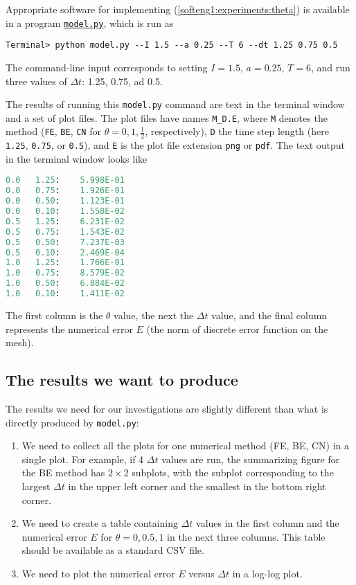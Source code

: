 \documentclass[graybox,sectrefs,envcountresetchap,open=right,final]{svmonodo}
\begin{document}
Appropriate software for implementing (\ref{softeng1:experiments:theta})
is available in a program \href{{http://tinyurl.com/nc4upel/doconce_src/model.py}}{\nolinkurl{model.py}}, which is run as

\begin{Verbatim}[frame=lines,label=\fbox{{\tiny Terminal}},framesep=2.5mm,framerule=0.7pt,fontsize=\fontsize{9pt}{9pt}]
Terminal> python model.py --I 1.5 --a 0.25 --T 6 --dt 1.25 0.75 0.5
\end{Verbatim}
The command-line input corresponds to setting $I=1.5$, $a=0.25$, $T=6$,
and run three values of $\Delta t$: 1.25, 0.75, ad 0.5.

The results of running this \texttt{model.py} command are text in the
terminal window and a set of plot files.
The plot files have names \Verb!M_D.E!, where \texttt{M} denotes the method
(\texttt{FE}, \texttt{BE}, \texttt{CN} for $\theta=0,1,\frac{1}{2}$, respectively), \texttt{D}
the time step length (here \texttt{1.25}, \texttt{0.75}, or \texttt{0.5}), and \texttt{E}
is the plot file extension \texttt{png} or \texttt{pdf}.
The text output in the terminal window looks like

\begin{lstlisting}[language=Python,style=blue1_bluegreen]
0.0   1.25:    5.998E-01
0.0   0.75:    1.926E-01
0.0   0.50:    1.123E-01
0.0   0.10:    1.558E-02
0.5   1.25:    6.231E-02
0.5   0.75:    1.543E-02
0.5   0.50:    7.237E-03
0.5   0.10:    2.469E-04
1.0   1.25:    1.766E-01
1.0   0.75:    8.579E-02
1.0   0.50:    6.884E-02
1.0   0.10:    1.411E-02
\end{lstlisting}
The first column is the $\theta$ value, the next the $\Delta t$ value,
and the final column represents the numerical error $E$ (the
norm of discrete error function on the mesh).

\subsection{The results we want to produce}

The results we need for our investigations are slightly different than
what is directly produced by \texttt{model.py}:

\begin{enumerate}
\item We need to collect all the plots for one
   numerical method (FE, BE, CN) in a single plot.
   For example, if 4 $\Delta t$ values are run, the summarizing figure
   for the BE method has $2\times 2$ subplots, with the subplot corresponding
   to the largest $\Delta t$ in the upper left corner and the smallest
   in the bottom right corner.

\item We need to create a table containing
   $\Delta t$ values in the first column and the numerical error
   $E$ for $\theta=0,0.5,1$
   in the next three columns. This table should be available as a
   standard CSV file.

\item We need to plot the numerical error $E$ versus $\Delta t$
   in a log-log plot.
\end{enumerate}
\end{document}
